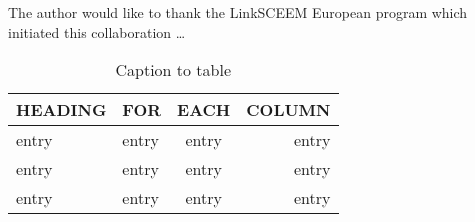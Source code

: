 \documentclass[preprint]{iucr}              %
\begin{document}

The author would like to thank the LinkSCEEM European program which initiated 
this collaboration \ldots  



\begin{table}
\caption{Caption to table}
\begin{tabular}{llcr}      %
 HEADING    & FOR        & EACH       & COLUMN     \\
\hline
 entry      & entry      & entry      & entry      \\
 entry      & entry      & entry      & entry      \\
 entry      & entry      & entry      & entry      \\
\end{tabular}
\end{table}


\end{document}
